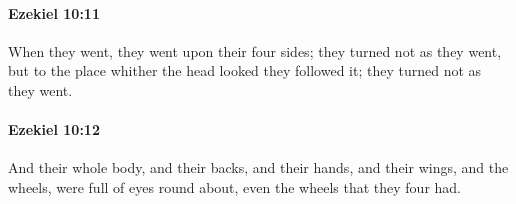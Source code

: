 		\paragraph{Ezekiel 10:11} %
			\label{EZEKIEL-10-11}

			When they went, they went upon their four sides; they turned not as they went, but to the place whither the head looked they followed it; they turned not as they went.


		\paragraph{Ezekiel 10:12} %
			\label{EZEKIEL-10-12}

			And their whole body, and their backs, and their hands, and their wings, and the wheels, were full of eyes round about, even the wheels that they four had.


